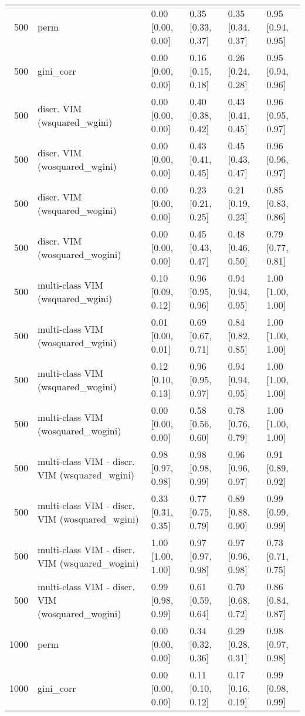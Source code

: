 \begin{table}[ht]
\begin{tabular}{rlllll}
   \hline 500 & perm & 0.00 [0.00, 0.00] & 0.35 [0.33, 0.37] & 0.35 [0.34, 0.37] & 0.95 [0.94, 0.95] \\ 
  500 & gini\_corr & 0.00 [0.00, 0.00] & 0.16 [0.15, 0.18] & 0.26 [0.24, 0.28] & 0.95 [0.94, 0.96] \\ 
  500 & discr. VIM (wsquared\_wgini) & 0.00 [0.00, 0.00] & 0.40 [0.38, 0.42] & 0.43 [0.41, 0.45] & 0.96 [0.95, 0.97] \\ 
  500 & discr. VIM (wosquared\_wgini) & 0.00 [0.00, 0.00] & 0.43 [0.41, 0.45] & 0.45 [0.43, 0.47] & 0.96 [0.96, 0.97] \\ 
  500 & discr. VIM (wsquared\_wogini) & 0.00 [0.00, 0.00] & 0.23 [0.21, 0.25] & 0.21 [0.19, 0.23] & 0.85 [0.83, 0.86] \\ 
  500 & discr. VIM (wosquared\_wogini) & 0.00 [0.00, 0.00] & 0.45 [0.43, 0.47] & 0.48 [0.46, 0.50] & 0.79 [0.77, 0.81] \\ 
  500 & multi-class VIM (wsquared\_wgini) & 0.10 [0.09, 0.12] & 0.96 [0.95, 0.96] & 0.94 [0.94, 0.95] & 1.00 [1.00, 1.00] \\ 
  500 & multi-class VIM (wosquared\_wgini) & 0.01 [0.00, 0.01] & 0.69 [0.67, 0.71] & 0.84 [0.82, 0.85] & 1.00 [1.00, 1.00] \\ 
  500 & multi-class VIM (wsquared\_wogini) & 0.12 [0.10, 0.13] & 0.96 [0.95, 0.97] & 0.94 [0.94, 0.95] & 1.00 [1.00, 1.00] \\ 
  500 & multi-class VIM (wosquared\_wogini) & 0.00 [0.00, 0.00] & 0.58 [0.56, 0.60] & 0.78 [0.76, 0.79] & 1.00 [1.00, 1.00] \\ 
  500 & multi-class VIM - discr. VIM (wsquared\_wgini) & 0.98 [0.97, 0.98] & 0.98 [0.98, 0.99] & 0.96 [0.96, 0.97] & 0.91 [0.89, 0.92] \\ 
  500 & multi-class VIM - discr. VIM (wosquared\_wgini) & 0.33 [0.31, 0.35] & 0.77 [0.75, 0.79] & 0.89 [0.88, 0.90] & 0.99 [0.99, 0.99] \\ 
  500 & multi-class VIM - discr. VIM (wsquared\_wogini) & 1.00 [1.00, 1.00] & 0.97 [0.97, 0.98] & 0.97 [0.96, 0.98] & 0.73 [0.71, 0.75] \\ 
  500 & multi-class VIM - discr. VIM (wosquared\_wogini) & 0.99 [0.98, 0.99] & 0.61 [0.59, 0.64] & 0.70 [0.68, 0.72] & 0.86 [0.84, 0.87] \\ 
   \hline 1000 & perm & 0.00 [0.00, 0.00] & 0.34 [0.32, 0.36] & 0.29 [0.28, 0.31] & 0.98 [0.97, 0.98] \\ 
  1000 & gini\_corr & 0.00 [0.00, 0.00] & 0.11 [0.10, 0.12] & 0.17 [0.16, 0.19] & 0.99 [0.98, 0.99] \\ 

\end{tabular}
\end{table}

